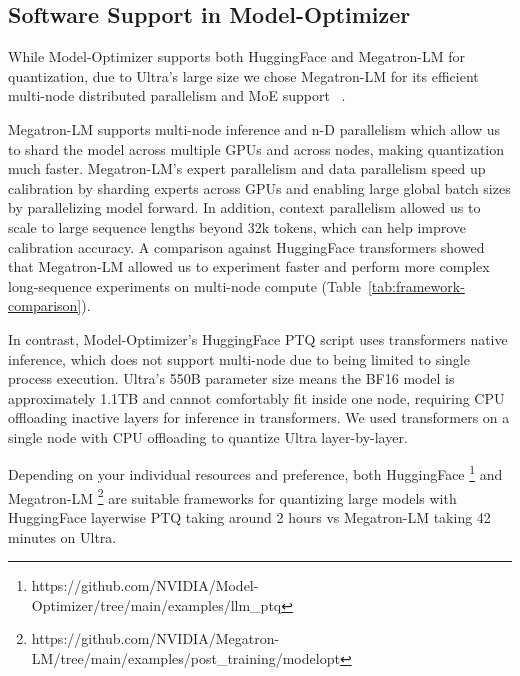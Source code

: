 


\subsection{Software Support in Model-Optimizer }
 While Model-Optimizer supports both HuggingFace and Megatron-LM for quantization, due to Ultra’s large size we chose Megatron-LM for its efficient multi-node distributed parallelism and MoE support  ~\citep{yan2026scalabletrainingmixtureofexpertsmodels}. 

Megatron-LM supports multi-node inference and n-D parallelism which allow us to shard the model across multiple GPUs and across nodes, making quantization much faster. Megatron-LM’s expert parallelism and data parallelism speed up calibration by sharding experts across GPUs and enabling large global batch sizes by parallelizing model forward. In addition, context parallelism allowed us to scale to large sequence lengths beyond 32k tokens, which can help improve calibration accuracy. A comparison against HuggingFace transformers showed that Megatron-LM allowed us to experiment faster and perform more complex long-sequence experiments on multi-node compute (Table~\ref{tab:framework-comparison}). 

In contrast, Model-Optimizer's HuggingFace PTQ script uses transformers native inference, which does not support multi-node due to being limited to single process execution. Ultra’s 550B parameter size means the BF16 model is approximately 1.1TB and cannot comfortably fit inside one node, requiring CPU offloading inactive layers for inference in transformers. We used transformers on a single node with CPU offloading to quantize Ultra layer-by-layer.

Depending on your individual resources and preference, both HuggingFace \footnote{https://github.com/NVIDIA/Model-Optimizer/tree/main/examples/llm\_ptq} and Megatron-LM \footnote{https://github.com/NVIDIA/Megatron-LM/tree/main/examples/post\_training/modelopt} are suitable frameworks for quantizing large models with HuggingFace layerwise PTQ taking around 2 hours vs Megatron-LM taking 42 minutes on Ultra. 

